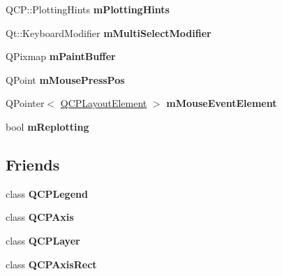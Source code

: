 \begin{DoxyCompactItemize}
\item 
\hypertarget{classQCustomPlot_aa184197a6101a9cc5807469e1d006c9e}{\-Q\-C\-P\-::\-Plotting\-Hints {\bfseries m\-Plotting\-Hints}}\label{classQCustomPlot_aa184197a6101a9cc5807469e1d006c9e}

\item 
\hypertarget{classQCustomPlot_a0e97e701c5671e7e463d2ce0211d0f8a}{\-Qt\-::\-Keyboard\-Modifier {\bfseries m\-Multi\-Select\-Modifier}}\label{classQCustomPlot_a0e97e701c5671e7e463d2ce0211d0f8a}

\item 
\hypertarget{classQCustomPlot_a753630df96e0672098d9e88bd41d1913}{\-Q\-Pixmap {\bfseries m\-Paint\-Buffer}}\label{classQCustomPlot_a753630df96e0672098d9e88bd41d1913}

\item 
\hypertarget{classQCustomPlot_ac57090da95056ae4dd67be67adfa85bd}{\-Q\-Point {\bfseries m\-Mouse\-Press\-Pos}}\label{classQCustomPlot_ac57090da95056ae4dd67be67adfa85bd}

\item 
\hypertarget{classQCustomPlot_a2f2e8b25e59cf3cf7b15e4767c02e747}{\-Q\-Pointer$<$ \hyperlink{classQCPLayoutElement}{\-Q\-C\-P\-Layout\-Element} $>$ {\bfseries m\-Mouse\-Event\-Element}}\label{classQCustomPlot_a2f2e8b25e59cf3cf7b15e4767c02e747}

\item 
\hypertarget{classQCustomPlot_ab30daeca6612c3948afd368dce5f1c39}{bool {\bfseries m\-Replotting}}\label{classQCustomPlot_ab30daeca6612c3948afd368dce5f1c39}

\end{DoxyCompactItemize}
\subsection*{\-Friends}
\begin{DoxyCompactItemize}
\item 
\hypertarget{classQCustomPlot_a8429035e7adfbd7f05805a6530ad5e3b}{class {\bfseries \-Q\-C\-P\-Legend}}\label{classQCustomPlot_a8429035e7adfbd7f05805a6530ad5e3b}

\item 
\hypertarget{classQCustomPlot_af123edeca169ec7a31958a1d714e1a8a}{class {\bfseries \-Q\-C\-P\-Axis}}\label{classQCustomPlot_af123edeca169ec7a31958a1d714e1a8a}

\item 
\hypertarget{classQCustomPlot_a5dbf96bf7664c1b6fce49063eeea6eef}{class {\bfseries \-Q\-C\-P\-Layer}}\label{classQCustomPlot_a5dbf96bf7664c1b6fce49063eeea6eef}

\item 
\hypertarget{classQCustomPlot_acbf20ecb140f66c5fd1bc64ae0762990}{class {\bfseries \-Q\-C\-P\-Axis\-Rect}}\label{classQCustomPlot_acbf20ecb140f66c5fd1bc64ae0762990}

\end{DoxyCompactItemize}


